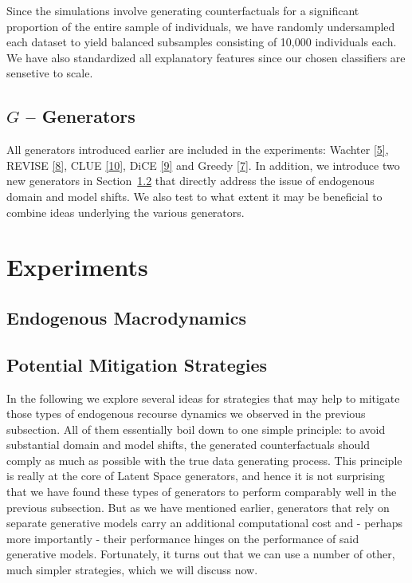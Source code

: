 \documentclass[
  conference]{IEEEtran}
\begin{document}
Since the simulations involve generating counterfactuals for a
significant proportion of the entire sample of individuals, we have
randomly undersampled each dataset to yield balanced subsamples
consisting of 10,000 individuals each. We have also standardized all
explanatory features since our chosen classifiers are sensetive to
scale.

\hypertarget{g-generators}{%
\subsection{\texorpdfstring{\(G\) --
Generators}{G -- Generators}}\label{g-generators}}

All generators introduced earlier are included in the experiments:
Wachter \protect\hyperlink{ref-wachter2017counterfactual}{{[}5{]}},
REVISE \protect\hyperlink{ref-joshi2019towards}{{[}8{]}}, CLUE
\protect\hyperlink{ref-antoran2020getting}{{[}10{]}}, DiCE
\protect\hyperlink{ref-mothilal2020explaining}{{[}9{]}} and Greedy
\protect\hyperlink{ref-schut2021generating}{{[}7{]}}. In addition, we
introduce two new generators in Section~\ref{sec-empirical-2-mitigate}
that directly address the issue of endogenous domain and model shifts.
We also test to what extent it may be beneficial to combine ideas
underlying the various generators.

\hypertarget{sec-empirical-2}{%
\section{Experiments}\label{sec-empirical-2}}

\hypertarget{endogenous-macrodynamics}{%
\subsection{Endogenous Macrodynamics}\label{endogenous-macrodynamics}}

\hypertarget{sec-empirical-2-mitigate}{%
\subsection{Potential Mitigation
Strategies}\label{sec-empirical-2-mitigate}}

In the following we explore several ideas for strategies that may help
to mitigate those types of endogenous recourse dynamics we observed in
the previous subsection. All of them essentially boil down to one simple
principle: to avoid substantial domain and model shifts, the generated
counterfactuals should comply as much as possible with the true data
generating process. This principle is really at the core of Latent Space
generators, and hence it is not surprising that we have found these
types of generators to perform comparably well in the previous
subsection. But as we have mentioned earlier, generators that rely on
separate generative models carry an additional computational cost and -
perhaps more importantly - their performance hinges on the performance
of said generative models. Fortunately, it turns out that we can use a
number of other, much simpler strategies, which we will discuss now.
\end{document}
